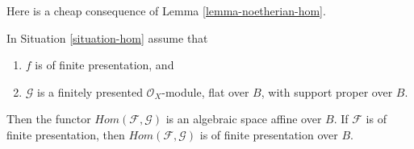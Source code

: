\noindent
Here is a cheap consequence of Lemma \ref{lemma-noetherian-hom}.

\begin{proposition}
\label{proposition-hom}
In Situation \ref{situation-hom} assume that
\begin{enumerate}
\item $f$ is of finite presentation, and
\item $\mathcal{G}$ is a finitely presented $\mathcal{O}_X$-module,
flat over $B$, with support proper over $B$.
\end{enumerate}
Then the functor $\mathit{Hom}(\mathcal{F}, \mathcal{G})$ is
an algebraic space affine over $B$. If $\mathcal{F}$
is of finite presentation, then $\mathit{Hom}(\mathcal{F}, \mathcal{G})$
is of finite presentation over $B$.
\end{proposition}

